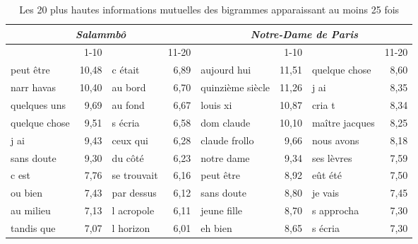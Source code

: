 \documentclass[]{article}
\begin{document}
\begin{table}[htdp]
\caption{Les 20 plus hautes informations mutuelles des bigrammes apparaissant au moins 25 fois}
\begin{small}
\begin{center}\begin{tabular}{lrlr|lrlr}
\multicolumn{4}{c}{\textit{Salammbô}}&\multicolumn{4}{c}{\textit{Notre-Dame de Paris}}\\
\hline
&1-10&&11-20&&1-10&&11-20\\
\hline
\hline
 peut être &10,48& c était &6,89& aujourd hui &11,51& quelque chose &8,60\\
 narr havas &10,40& au bord &6,70& quinzième siècle &11,26& j ai &8,35\\
 quelques uns &9,69& au fond &6,67& louis xi &10,87& cria t &8,34\\
 quelque chose &9,51& s écria &6,58& dom claude &10,10& maître jacques &8,25\\
 j ai &9,43& ceux qui &6,28& claude frollo &9,66& nous avons &8,18\\
 sans doute &9,30& du côté &6,23& notre dame &9,34& ses lèvres &7,59\\
 c est &7,76& se trouvait &6,16& peut être &8,92& eût été &7,50\\
 ou bien &7,43& par dessus &6,12& sans doute &8,80& je vais &7,45\\
 au milieu &7,13& l acropole &6,11& jeune fille &8,70& s approcha &7,30\\
 tandis que &7,07& l horizon &6,01& eh bien &8,65& s écria &7,30\\
\hline
\end{tabular} 
\end{center}
\end{small}
\label{info_mutuelle}
\end{table}  
 
\end{document}
